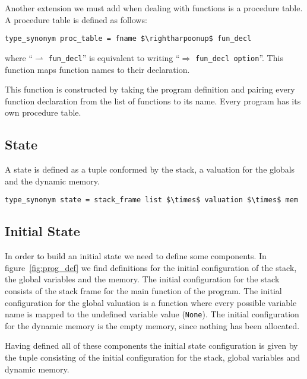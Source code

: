 Another extension we must add when dealing with functions is a procedure table.
A procedure table is defined as follows:

\begin{lstlisting}[mathescape=true, frame=single]
type_synonym proc_table = fname $\rightharpoonup$ fun_decl
\end{lstlisting}

where ``$\rightharpoonup$ \verb|fun_decl|'' is equivalent to writing ``$\Rightarrow$ \verb|fun_decl option|''.
This function maps function names to their declaration.

This function is constructed by taking the program definition and pairing every function declaration from the list of functions to its name.
Every program has its own procedure table.


\subsection{State}\label{subsection:state}

A state is defined as a tuple conformed by the stack, a valuation for the globals and the dynamic memory.

\begin{lstlisting}[mathescape=true, frame=single]
type_synonym state = stack_frame list $\times$ valuation $\times$ mem
\end{lstlisting}

\subsection{Initial State}\label{subsection:initial_state}

In order to build an initial state we need to define some components.
In figure~\ref{fig:prog_def} we find definitions for the initial configuration of the stack, the global variables and the memory.
The initial configuration for the stack consists of the stack frame for the main function of the program.
The initial configuration for the global valuation is a function where every possible variable name is mapped to the undefined variable value (\verb|None|).
The initial configuration for the dynamic memory is the empty memory, since nothing has been allocated.

Having defined all of these components the initial state configuration is given by the tuple consisting of the initial configuration for the stack, global variables and dynamic memory.


